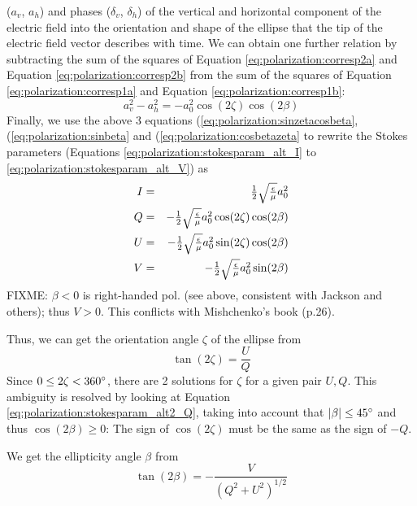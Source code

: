 ($a_v$, $a_h$) and phases ($\delta_v$, $\delta_h$) of the vertical and
horizontal component of the electric field into the orientation and
shape of the ellipse that the tip of the electric field vector describes with
time.  We can obtain one further relation by subtracting the sum of
the squares of Equation \ref{eq:polarization:corresp2a} and
Equation \ref{eq:polarization:corresp2b} from the sum of the squares of
Equation \ref{eq:polarization:corresp1a} and
Equation \ref{eq:polarization:corresp1b}:
\begin{equation}
  \label{eq:polarization:cosbetazeta}
 a_v^2 - a_h^2 =  -a_0^2 \cos(2\zeta)\cos(2\beta)
\end{equation}
Finally, we use the above 3 equations
(\ref{eq:polarization:sinzetacosbeta}, 
(\ref{eq:polarization:sinbeta} and 
(\ref{eq:polarization:cosbetazeta} to rewrite the Stokes parameters
(Equations \ref{eq:polarization:stokesparam_alt_I} to
\ref{eq:polarization:stokesparam_alt_V}) 
as
\begin{eqnarray}
  \label{eq:polarization:stokesparam_alt2_I}
 I &=&  \textstyle\frac{1}{2}\sqrt{\textstyle{\frac{\epsilon}{\mu}}} a_0^2\\
  \label{eq:polarization:stokesparam_alt2_Q}
 Q &=&  - \textstyle\frac{1}{2}\sqrt{\textstyle{\frac{\epsilon}{\mu}}} a_0^2 \cos(2\zeta)\cos(2\beta)\\ 
  \label{eq:polarization:stokesparam_alt2_U}
 U &=& -\textstyle\frac{1}{2}\sqrt{\textstyle{\frac{\epsilon}{\mu}}} a_0^2 \sin(2\zeta)\cos(2\beta)\\
  \label{eq:polarization:stokesparam_alt2_V}
 V &=& -\textstyle\frac{1}{2}\sqrt{\textstyle{\frac{\epsilon}{\mu}}} a_0^2 \sin(2\beta)
\end{eqnarray}
FIXME: $\beta<0$ is right-handed pol. (see above, consistent with
Jackson and others); thus $V>0$. This conflicts with Mishchenko's book
(p.26).
  

Thus, we can get the orientation angle $\zeta$ of the ellipse from
\begin{equation}
  \label{eq:polarization:tan2zeta}
 \tan(2\zeta) = \frac{U}{Q}
\end{equation}
Since $0 \leq 2\zeta < 360^\circ$, there are 2 solutions for $\zeta$ for a
given pair $U,Q$. This ambiguity is resolved by looking at
Equation \ref{eq:polarization:stokesparam_alt2_Q}, taking into account that
$|\beta| \leq 45^\circ$ and thus $\cos(2\beta) \geq 0$:
The sign of $\cos(2\zeta)$ must be the same as the sign of $-Q$.

We get the ellipticity angle $\beta$  from
\begin{equation}
  \label{eq:polarization:tan2beta}
 \tan(2\beta) = - \frac{V}{(Q^2 + U^2)^{1/2}}  
\end{equation}

